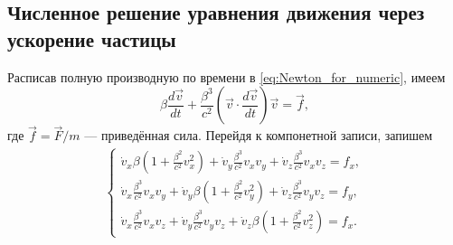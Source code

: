 \subsection{Численное решение уравнения движения через ускорение частицы}

Расписав полную производную по времени в \eqref{eq:Newton_for_numeric}, имеем
\begin{equation}
\beta \frac{d \vec{v}}{dt} + \frac{\beta^3}{c^2} (\vec{v} \cdot \frac{d \vec{v}}{dt}) \vec{v} = \vec{f},
\end{equation}
где $\vec{f} = \vec{F}/m$ --- приведённая сила. Перейдя к компонетной записи, запишем
\begin{eqnarray*}
\begin{cases}
\dot{v}_x \beta \left(1 + \frac{\beta^2}{c^2} v_x^2 \right) +
\dot{v}_y \frac{\beta^3}{c^2} v_x v_y + 
\dot{v}_z \frac{\beta^3}{c^2} v_x v_z  = f_x, \\

\dot{v}_x \frac{\beta^3}{c^2} v_x v_y +
\dot{v}_y \beta \left(1 + \frac{\beta^2}{c^2} v_y^2 \right) + 
\dot{v}_z \frac{\beta^3}{c^2} v_y v_z  = f_y, \\

\dot{v}_x  \frac{\beta^3}{c^2} v_x v_z +
\dot{v}_y \frac{\beta^3}{c^2} v_y v_z + 
\dot{v}_z \beta \left(1 + \frac{\beta^2}{c^2} v_z^2 \right)  = f_x.
\end{cases}
\end{eqnarray*}

